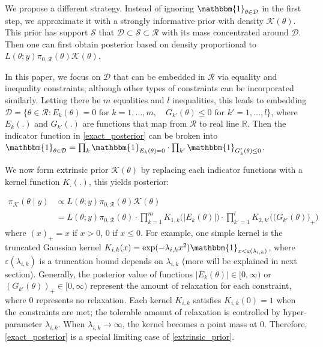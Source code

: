 \documentclass[10pt]{article}
\newcommand{\mc}[1]{\mathcal{#1}}
\DeclareMathOperator{\1}{\mathbbm{1}}
\begin{document}
We propose a different strategy. Instead of ignoring $\mathbbm{1}_{\theta\in \mc D} $ in the first step, we approximate it with a strongly informative prior with density $\mc K(\theta)$. This prior has support $\mc S$ that $\mc D\subset\mc S\subset\mc R$ with its mass concentrated around $\mc D$. Then one can first obtain posterior based on density proportional to $L(\theta;y)\pi_{0,\mc R}(\theta)\mc K(\theta)$.

In this paper, we focus on $\mc D$ that can be embedded in $\mc R$ via equality and inequality constraints, although other types of constraints can be incorporated similarly. Letting there be $m$ equalities and $l$ inequalities, this leads to embedding $\mc D = \{ \theta \in \mc R: E_k(\theta)=0 \text{ for } k=1,\ldots,m, \quad G_{k'}(\theta)\le 0  \text{ for } k'=1,\ldots,l \}$, where $E_k(.)$ and $G_{k'}(.)$ are functions that map from $\mc R$ to real line $\mathbb R$. Then the indicator function in \eqref{exact_posterior} can be broken into $\mathbbm{1}_{\theta\in \mc D} = \prod_k \mathbbm{1}_{E_k(\theta)=0} \cdot \prod_{k'}\mathbbm{1}_{G_k'(\theta)\le 0}$.


We now form extrinsic prior $\mc K(\theta)$ by replacing each indicator functions with a kernel function $K_.(.)$, this yields posterior:

\begin{equation}
\begin{aligned}
\label{extrinsic_prior}
\pi_{\mc K}(\theta \mid y) & \propto L(\theta;y)\pi_{0,\mc R}(\theta) \mc K(\theta) \\
&= L(\theta;y)\pi_{0,\mc R}(\theta) \cdot \prod_{k=1}^{m} K_{1,k}\Big( | E_k(\theta)| \Big) \cdot \prod_{k'=1}^{l} K_{2,k'}\Big( \big( G_{k'}(\theta) \big)_+ \Big)
\end{aligned}
\end{equation}
where $(x)_+ = x$ if $x>0$, $0$ if $x\le 0$. For example, one simple kernel is the truncated Gaussian kernel $K_{i,k}(x) = \exp( -{\lambda_{i,k} x^2}) \mathbbm{1}_{x<\varepsilon(\lambda_{i,k})}$, where $\varepsilon(\lambda_{i,k})$ is a truncation bound depends on $\lambda_{i,k}$ (more will be explained in next section). Generally, the posterior value of functions $|E_k(\theta)|\in [0,\infty)$ or $(G_{k'}(\theta))_+ \in [0,\infty)$ represent the amount of relaxation for each constraint, where $0$ represents no relaxation. Each kernel $K_{i,k}$ satisfies $K_{i,k}(0)=1$ when the constraints are met; the tolerable amount of relaxation is controlled by hyper-parameter $\lambda_{i,k}$. When $\lambda_{i,k} \rightarrow \infty$, the kernel becomes a point mass at $0$. Therefore, \eqref{exact_posterior} is a special limiting case of \eqref{extrinsic_prior}.
\end{document}
